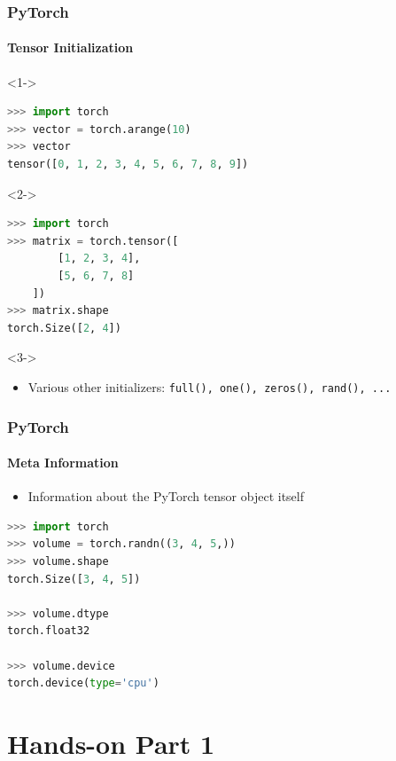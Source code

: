\documentclass[aspectratio=1610]{beamer}
\begin{document}
\begin{frame}[fragile]
    \frametitle{PyTorch}
    \framesubtitle{Tensor Initialization}
    
    \begin{onlyenv}<1->
    \begin{lstlisting}[language=Python]
>>> import torch
>>> vector = torch.arange(10)
>>> vector 
tensor([0, 1, 2, 3, 4, 5, 6, 7, 8, 9])
    \end{lstlisting}
    \end{onlyenv}
    \vspace{1em}
    \begin{onlyenv}<2->
    \begin{lstlisting}[language=Python]
>>> import torch
>>> matrix = torch.tensor([
        [1, 2, 3, 4],
        [5, 6, 7, 8]
    ])
>>> matrix.shape
torch.Size([2, 4])
    \end{lstlisting}
    \end{onlyenv}
    \vspace{1em}
    \begin{onlyenv}<3->
        \begin{itemize}
            \item Various other initializers: \texttt{full(), one(), zeros(), rand(), ...}
        \end{itemize}
    \end{onlyenv}
\end{frame}

\begin{frame}[fragile]
    \frametitle{PyTorch}
    \framesubtitle{Meta Information}

    \begin{itemize}
        \item Information about the PyTorch tensor object itself
    \end{itemize}
    \vspace{1em}
    \begin{lstlisting}[language=Python]
>>> import torch
>>> volume = torch.randn((3, 4, 5,))
>>> volume.shape
torch.Size([3, 4, 5])

>>> volume.dtype
torch.float32

>>> volume.device
torch.device(type='cpu')
    \end{lstlisting}
\end{frame}

\section{Hands-on Part 1}
\end{document}
